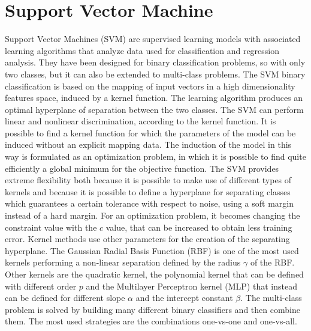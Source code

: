 \documentclass[final,a4paper,12pt,english]{UnicaPhdThesis3}
\begin{document}
\section{Support Vector Machine} \label{SVM}
Support Vector Machines (\acs{SVM}) are supervised learning models with associated learning algorithms that analyze data used for classification and regression analysis. They have been designed for binary classification problems, so with only two classes, but it can also be extended to multi-class problems. The SVM binary classification is based on the mapping of input vectors in a high dimensionality features space, induced by a kernel function. The learning algorithm produces an optimal hyperplane of separation between the two classes. The SVM can perform linear and nonlinear discrimination, according to the kernel function. It is possible to find a kernel function for which the parameters of the model can be induced without an explicit mapping data. The induction of the model in this way is formulated as an optimization problem, in which it is possible to find quite efficiently a global minimum for the objective function. The SVM provides extreme flexibility both because it is possible to make use of different types of kernels and because it is possible to define a hyperplane for separating classes which guarantees a certain tolerance with respect to noise, using a soft margin instead of a hard margin. For an optimization problem, it becomes changing the constraint value with the $c$ value, that can be increased to obtain less training error. Kernel methods use other parameters for the creation of the separating hyperplane. The Gaussian Radial Basis Function (\acs{RBF}) is one of the most used kernels performing a non-linear separation defined by the radius  $\gamma$ of the RBF. Other kernels are the quadratic kernel, the polynomial kernel that can be defined with different order $p$ and the Multilayer Perceptron kernel (MLP) that instead can be defined for different slope $\alpha$ and the intercept constant $\beta$. The multi-class problem is solved by building many different binary classifiers and then combine them. The most used strategies are the combinations one-vs-one and one-vs-all. 
\end{document}
